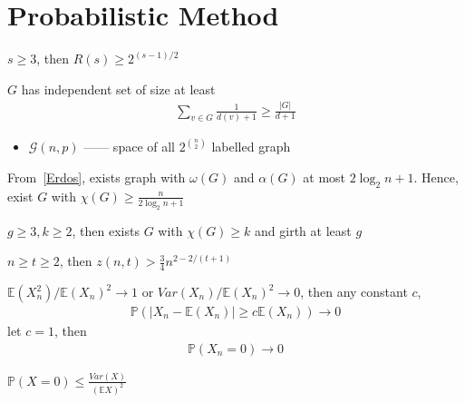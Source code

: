\section{Probabilistic Method}\label{sec:probabilistic-method}

\begin{thm}[Erdos]\label{Erdos}
$s \geq 3$, then $R(s) \geq 2^{(s-1)/2}$
\end{thm}

\begin{thm}
    $G$ has independent set of size at least
    \begin{align*}
        \sum_{v \in G} \frac{1}{d(v) + 1} \geq \frac{|G|}{d + 1}
    \end{align*}
\end{thm}

\begin{itemize}
    \item $\mathcal{G}(n, p)$ ------ space of all $2^{n \choose 2}$ labelled graph
\end{itemize}

\begin{fact}
    From~\ref{Erdos}, exists graph with $\omega(G)$ and $\alpha(G)$ at most $2\log_2 n +1$.
    Hence, exist $G$ with $\chi(G) \geq \frac{n}{2\log_2 n + 1}$
\end{fact}

\begin{thm}[Erdos]
    $g \geq 3, k \geq 2$, then exists $G$ with $\chi(G) \geq k$ and girth at least $g$
\end{thm}

\begin{thm}
    $n \geq t \geq 2$, then $z(n, t) > \frac{3}{4}n^{2- 2/(t+1)}$
\end{thm}

\begin{lemma}
    $\mathbb{E}(X_n^2) / \mathbb{E}(X_n)^2 \rightarrow 1$ or $Var(X_n) / \mathbb{E}(X_n)^2 \rightarrow 0$, then
    any constant $c$,
    \begin{align*}
        \mathbb{P}(|X_n - \mathbb{E}(X_n)| \geq c\mathbb{E}(X_n)) \rightarrow 0
    \end{align*}
    let $c = 1$, then
    \begin{align*}
        \mathbb{P}(X_n = 0) \rightarrow 0
    \end{align*}
\end{lemma}

\begin{fact}
    $\mathbb{P}(X = 0) \leq \frac{Var(X)}{(\mathbb{E}X)^2}$
\end{fact}

